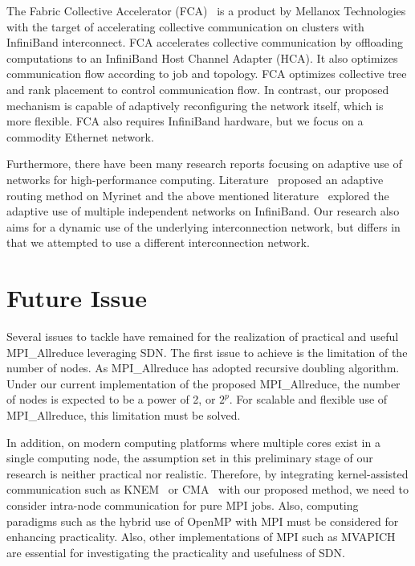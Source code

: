 The Fabric Collective Accelerator (FCA)~\autocite{fca} is a product by
Mellanox Technologies with the target of accelerating collective
communication on clusters with InfiniBand interconnect. FCA accelerates
collective communication by offloading computations to an InfiniBand
Host Channel Adapter (HCA). It also optimizes communication flow
according to job and topology. FCA optimizes collective tree and rank
placement to control communication flow. In contrast, our proposed
mechanism is capable of adaptively reconfiguring the network itself,
which is more flexible. FCA also requires InfiniBand hardware, but we
focus on a commodity Ethernet network.

Furthermore, there have been many research reports focusing on adaptive
use of networks for high-performance computing. Literature~\autocite{Geoffray2008}
proposed an adaptive routing method on Myrinet and the above mentioned
literature~\autocite{Jiuxing2004} explored the adaptive use of multiple
independent networks on InfiniBand. Our research also aims for a dynamic use
of the underlying interconnection network, but differs in that we attempted to
use a different interconnection network.

\section{Future Issue}\label{iii-future-issue}

Several issues to tackle have remained for the realization of practical
and useful MPI\_Allreduce leveraging SDN\@. The first issue to
achieve is the limitation of the number of nodes. As
MPI\_Allreduce has adopted recursive doubling algorithm. Under
our current implementation of the proposed MPI\_Allreduce, the
number of nodes is expected to be a power of 2, or \(2^p\). For scalable
and flexible use of MPI\_Allreduce, this limitation must be
solved.

In addition, on modern computing platforms where multiple cores exist in
a single computing node, the assumption set in this preliminary stage of
our research is neither practical nor realistic. Therefore, by
integrating kernel-assisted communication such as KNEM~\autocite{Goglin2013}
or CMA~\autocite{cma} with our proposed method, we need to consider
intra-node communication for pure MPI jobs. Also, computing paradigms
such as the hybrid use of OpenMP with MPI must be considered for
enhancing practicality. Also, other implementations of MPI such as
MVAPICH~\autocite{mvapich} are essential for investigating the practicality
and usefulness of SDN\@.

